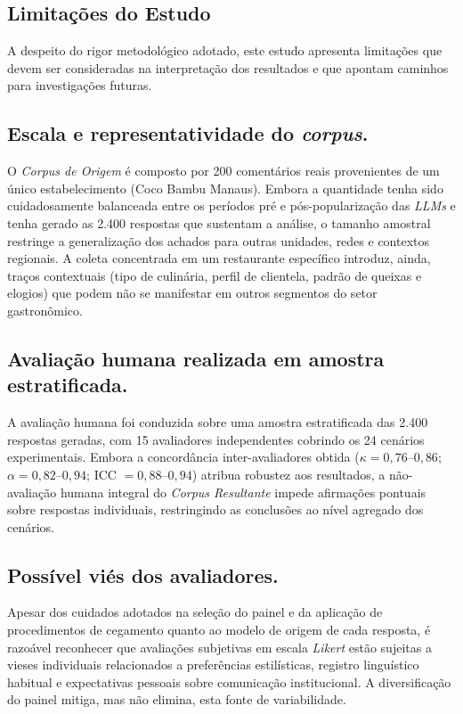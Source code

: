 \documentclass[12pt, a4paper]{article}
\numberwithin{equation}{section}
\begin{document}
 \subsection{Limitações do Estudo}
 
A despeito do rigor metodológico adotado, este estudo apresenta limitações que devem ser 
consideradas na interpretação dos resultados e que apontam caminhos para investigações futuras.
 
\subsection{Escala e representatividade do \textit{corpus}.}
 O \textit{Corpus de Origem} é composto por 200 comentários reais provenientes de um único estabelecimento (Coco Bambu Manaus). Embora a quantidade tenha sido cuidadosamente balanceada entre os períodos pré e pós-popularização das \textit{LLMs} e tenha gerado as 2.400 respostas que sustentam a análise, o tamanho amostral restringe a generalização dos achados para outras unidades, redes e contextos regionais. A coleta concentrada em um restaurante específico introduz, ainda, traços contextuais (tipo de culinária, perfil de clientela, padrão de queixas e elogios) que podem não se manifestar em outros segmentos do setor gastronômico.
 
 \subsection{Avaliação humana realizada em amostra estratificada.}
 A avaliação humana foi conduzida sobre uma amostra estratificada das 2.400 respostas geradas, com 15 avaliadores independentes cobrindo os 24 cenários experimentais. Embora a concordância inter-avaliadores obtida ($\kappa = 0{,}76$--$0{,}86$; $\alpha = 0{,}82$--$0{,}94$; ICC $=0{,}88$--$0{,}94$) atribua robustez aos resultados, a não-avaliação humana integral do \textit{Corpus Resultante} impede afirmações pontuais sobre respostas individuais, restringindo as conclusões ao nível agregado dos cenários.
 
 \subsection{Possível viés dos avaliadores.}
 Apesar dos cuidados adotados na seleção do painel e da aplicação de procedimentos de cegamento 
quanto ao modelo de origem de cada resposta, é razoável reconhecer que avaliações subjetivas em 
escala \textit{Likert} estão sujeitas a vieses individuais relacionados a preferências 
estilísticas, registro linguístico habitual e expectativas pessoais sobre comunicação 
institucional. A diversificação do painel mitiga, mas não elimina, esta fonte de variabilidade.
 
\end{document}
